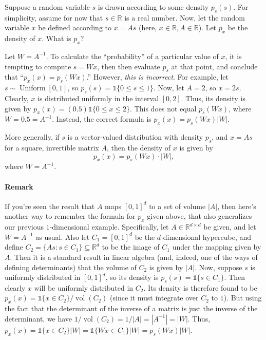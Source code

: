 Suppose a random variable $s$ is drawn according to some density $p_s(s)$.
For simplicity, assume for now that $s \in \mathbb R$ is a real number. Now, let the
random variable $x$ be defined according to $x = As$ (here, $x \in \mathbb R,A \in \mathbb R$). Let
$p_x$ be the density of $x$. What is $p_x$?

Let $W = A^{-1}$. To calculate the ``probability'' of a particular value of $x$,
it is tempting to compute $s = Wx$, then then evaluate $p_s$ at that point, and
conclude that ``$p_x (x) = p_s(Wx)$.'' However, \textit{this is incorrect}. For example,
let $s \sim \operatorname{Uniform}[0,1]$, so $p_s(s) = \mathbb{1}\{0 \le s \le 1\}$. Now, let $A = 2$, so $x = 2s$.
Clearly, $x$ is distributed uniformly in the interval $[0,2]$. Thus, its density is
given by $p_x(x) = (0.5)\mathbb{1}\{0 \le x \le 2\}$. This does not equal $p_s(Wx)$, where
$W = 0.5 = A^{-1}$. Instead, the correct formula is $p_x (x) = p_s(Wx)|W|$.

More generally, if $s$ is a vector-valued distribution with density $p_s$, and
$x = As$ for a square, invertible matrix $A$, then the density of $x$ is given by
\[
    p_x (x) = p_s(Wx) \cdot |W|,
\]
where $W = A^{-1}$.

\paragraph{Remark} If you're seen the result that $A$ maps $[0,1]^d$ to a set of volume $|A|$,
then here's another way to remember the formula for $p_x$ given above, that also
generalizes our previous $1$-dimensional example. Specifically, let $A \in \mathbb R^{d \times d}$ be
given, and let $W = A^{-1}$ as usual. Also let $C_1 = [0,1]^d$ be the $d$-dimensional
hypercube, and define $C_2 = \{As : s \in C_1\} \subseteq \mathbb R^d$ to be the image of $C_1$
under the mapping given by $A$. Then it is a standard result in linear algebra
(and, indeed, one of the ways of defining determinants) that the volume of
$C_2$ is given by $|A|$. Now, suppose $s$ is uniformly distributed in $[0,1]^d$, so its
density is $p_s(s) = \mathbb{1}\{s \in C_1\}$. Then clearly $x$ will be uniformly distributed
in $C_2$. Its density is therefore found to be $p_x(x) = \mathbb{1}\{x \in C_2\}/\operatorname{vol}(C_2)$ (since
it must integrate over $C_2$ to $1$). But using the fact that the determinant
of the inverse of a matrix is just the inverse of the determinant, we have
$1/\operatorname{vol}(C_2) = 1/|A| = |A^{-1}| = |W|$. Thus, $p_x(x) = \mathbb{1}\{x \in C_2\}|W| = \mathbb{1}\{Wx \in
C_1\}|W| = p_s(Wx)|W|$.

